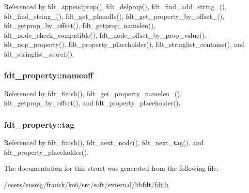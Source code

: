 Referenced by fdt\-\_\-appendprop(), fdt\-\_\-delprop(), fdt\-\_\-find\-\_\-add\-\_\-string\-\_\-(), fdt\-\_\-find\-\_\-string\-\_\-(), fdt\-\_\-get\-\_\-phandle(), fdt\-\_\-get\-\_\-property\-\_\-by\-\_\-offset\-\_\-(), fdt\-\_\-getprop\-\_\-by\-\_\-offset(), fdt\-\_\-getprop\-\_\-namelen(), fdt\-\_\-node\-\_\-check\-\_\-compatible(), fdt\-\_\-node\-\_\-offset\-\_\-by\-\_\-prop\-\_\-value(), fdt\-\_\-nop\-\_\-property(), fdt\-\_\-property\-\_\-placeholder(), fdt\-\_\-stringlist\-\_\-contains(), and fdt\-\_\-stringlist\-\_\-search().

\hypertarget{structfdt__property_ad5753794266beffe67b79b6e5b3ab352}{
\subsubsection[{nameoff}]{ fdt\-\_\-property\-::nameoff}}\label{structfdt__property_ad5753794266beffe67b79b6e5b3ab352}


Referenced by fdt\-\_\-finish(), fdt\-\_\-get\-\_\-property\-\_\-namelen\-\_\-(), fdt\-\_\-getprop\-\_\-by\-\_\-offset(), and fdt\-\_\-property\-\_\-placeholder().

\hypertarget{structfdt__property_a6c0d0fd0e741c931f7b3ca1482193740}{
\subsubsection[{tag}]{ fdt\-\_\-property\-::tag}}\label{structfdt__property_a6c0d0fd0e741c931f7b3ca1482193740}


Referenced by fdt\-\_\-finish(), fdt\-\_\-next\-\_\-node(), fdt\-\_\-next\-\_\-tag(), and fdt\-\_\-property\-\_\-placeholder().



The documentation for this struct was generated from the following file\-:\begin{DoxyCompactItemize}
\item 
/users/enseig/franck/ko6/src/soft/external/libfdt/\hyperlink{fdt_8h}{fdt.\-h}\end{DoxyCompactItemize}
